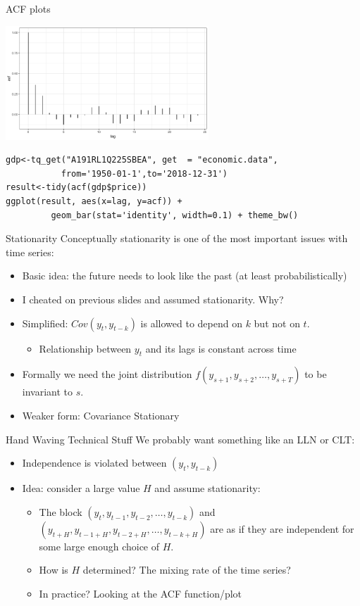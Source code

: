 \begin{frame}[fragile]{ACF plots}
\begin{center}
\includegraphics[width=3in]{./resources/acf_plot.png}
\end{center}
\small{
\begin{verbatim}
gdp<-tq_get("A191RL1Q225SBEA", get  = "economic.data",
           from='1950-01-1',to='2018-12-31')
result<-tidy(acf(gdp$price))
ggplot(result, aes(x=lag, y=acf)) +
         geom_bar(stat='identity', width=0.1) + theme_bw()
\end{verbatim}
}
\end{frame}


\begin{frame}{Stationarity}
Conceptually \alert{stationarity} is one of the most important issues with time series:
\begin{itemize}
\item Basic idea: the future needs to look like the past (at least probabilistically)
\item I cheated on previous slides and assumed stationarity. Why?
\item Simplified: $Cov(y_t,y_{t-k})$ is allowed to depend on $k$ but not on $t$.
\begin{itemize}
\item Relationship between $y_t$ and its lags is constant across time
\end{itemize}
\item Formally we need the joint distribution $f(y_{s+1},y_{s+2},\ldots,y_{s+T})$ to be invariant to $s$.
\item Weaker form: Covariance Stationary
\end{itemize}
\end{frame}

\begin{frame}{Hand Waving Technical Stuff}
We probably want something like an LLN or CLT:
\begin{itemize}
\item \alert{Independence} is violated between $(y_t,y_{t-k})$
\item Idea: consider a large value $H$ and assume \alert{stationarity}:
\begin{itemize}
\item The block $(y_t,y_{t-1},y_{t-2},\ldots,y_{t-k})$ and $(y_{t+H},y_{t-1+H},y_{t-2+H},\ldots,y_{t-k+H})$ are as if they are independent for some large enough choice of $H$.
\item How is $H$ determined? The \alert{mixing rate} of the time series?
\item In practice? Looking at the ACF function/plot
\end{itemize}
\end{itemize}
\end{frame}

